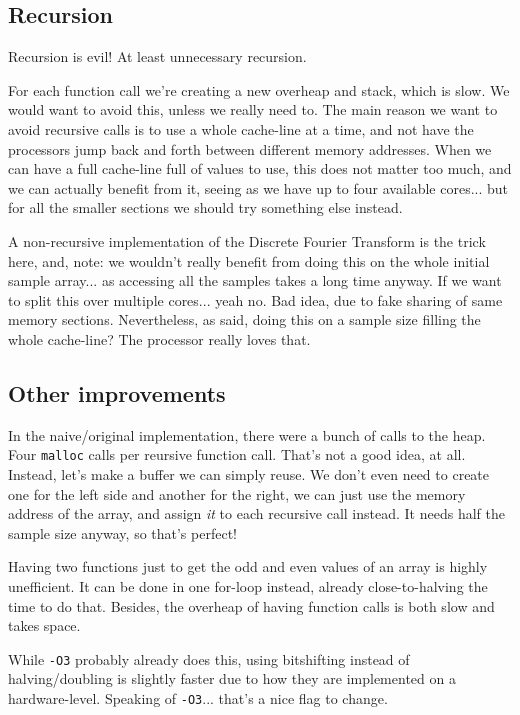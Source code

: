 \documentclass{../../../myassignment}
\begin{document}
	\pagebreak
	\subsection*{Recursion}
	Recursion is evil! At least unnecessary recursion. 

	For each function call we're creating a new overheap and stack, which is slow. We would want to avoid this, unless we really need to. The main reason we want to avoid recursive calls is to use a whole cache-line at a time, and not have the processors jump back and forth between different memory addresses. When we can have a full cache-line full of values to use, this does not matter too much, and we can actually benefit from it, seeing as we have up to four available cores... but for all the smaller sections we should try something else instead. 

	A non-recursive implementation of the Discrete Fourier Transform is the trick here, and, note: we wouldn't really benefit from doing this on the whole initial sample array... as accessing all the samples takes a long time anyway. If we want to split this over multiple cores... yeah no. Bad idea, due to fake sharing of same memory sections. Nevertheless, as said, doing this on a sample size filling the whole cache-line? The processor really loves that.

	\subsection*{Other improvements}
	In the naive/original implementation, there were a bunch of calls to the heap. Four \texttt{malloc} calls per reursive function call. That's not a good idea, at all. Instead, let's make a buffer we can simply reuse. We don't even need to create one for the left side and another for the right, we can just use the memory address of the array, and assign \textit{it} to each recursive call instead. It needs half the sample size anyway, so that's perfect!

	Having two functions just to get the odd and even values of an array is highly unefficient. It can be done in one for-loop instead, already close-to-halving the time to do that. Besides, the overheap of having function calls is both slow and takes space.

	While \texttt{-O3} probably already does this, using bitshifting instead of halving/doubling is slightly faster due to how they are implemented on a hardware-level. Speaking of \texttt{-O3}... that's a nice flag to change. 
\end{document}
